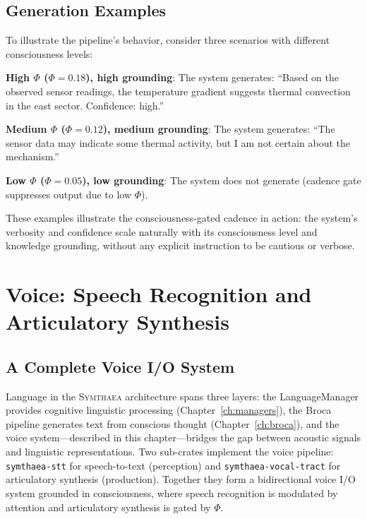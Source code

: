 \documentclass[12pt]{book}
\newcommand{\symthaea}{\textsc{Symthaea}}
\begin{document}
\section{Generation Examples}

To illustrate the pipeline's behavior, consider three scenarios with different consciousness levels:

\textbf{High $\Phi$ ($\Phi = 0.18$), high grounding}: The system generates: ``Based on the observed sensor readings, the temperature gradient suggests thermal convection in the east sector. Confidence: high.''

\textbf{Medium $\Phi$ ($\Phi = 0.12$), medium grounding}: The system generates: ``The sensor data may indicate some thermal activity, but I am not certain about the mechanism.''

\textbf{Low $\Phi$ ($\Phi = 0.05$), low grounding}: The system does not generate (cadence gate suppresses output due to low $\Phi$).

These examples illustrate the consciousness-gated cadence in action: the system's verbosity and confidence scale naturally with its consciousness level and knowledge grounding, without any explicit instruction to be cautious or verbose.


\chapter{Voice: Speech Recognition and Articulatory Synthesis}
\label{ch:voice}

\section{A Complete Voice I/O System}

Language in the \symthaea{} architecture spans three layers: the LanguageManager provides cognitive linguistic processing (Chapter~\ref{ch:managers}), the Broca pipeline generates text from conscious thought (Chapter~\ref{ch:broca}), and the voice system---described in this chapter---bridges the gap between acoustic signals and linguistic representations. Two sub-crates implement the voice pipeline: \texttt{symthaea-stt} for speech-to-text (perception) and \texttt{symthaea-vocal-tract} for articulatory synthesis (production). Together they form a bidirectional voice I/O system grounded in consciousness, where speech recognition is modulated by attention and articulatory synthesis is gated by $\Phi$.
\end{document}
